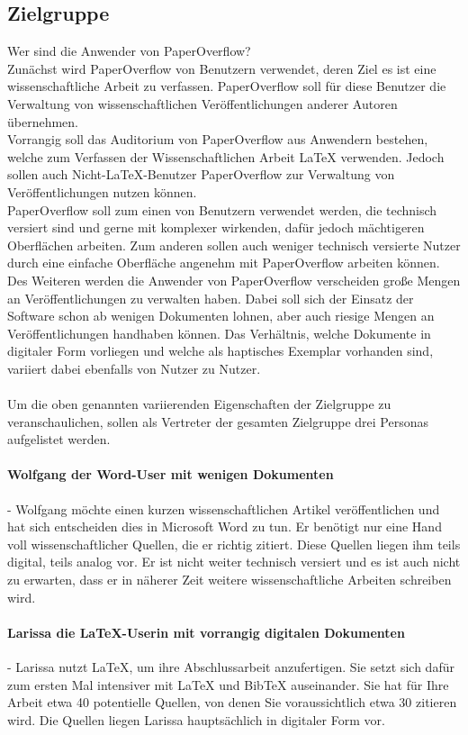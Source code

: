 \documentclass[a4paper,12pt]{article}
\begin{document}
\subsection{Zielgruppe}
Wer sind die Anwender von PaperOverflow?\\
Zunächst wird PaperOverflow von Benutzern verwendet, deren Ziel es ist eine wissenschaftliche Arbeit zu verfassen. PaperOverflow soll für diese Benutzer die Verwaltung von wissenschaftlichen Veröffentlichungen anderer Autoren übernehmen.\\
Vorrangig soll das Auditorium von PaperOverflow aus Anwendern bestehen, welche zum Verfassen der Wissenschaftlichen Arbeit LaTeX verwenden. Jedoch sollen auch Nicht-LaTeX-Benutzer PaperOverflow zur Verwaltung von Veröffentlichungen nutzen können.\\
PaperOverflow soll zum einen von Benutzern verwendet werden, die technisch versiert sind und gerne mit komplexer wirkenden, dafür jedoch mächtigeren Oberflächen arbeiten. Zum anderen sollen auch weniger technisch versierte Nutzer durch eine einfache Oberfläche angenehm mit PaperOverflow arbeiten können.\\
Des Weiteren werden die Anwender von PaperOverflow verscheiden große Mengen an Veröffentlichungen zu verwalten haben. Dabei soll sich der Einsatz der Software schon ab wenigen Dokumenten lohnen, aber auch riesige Mengen an Veröffentlichungen handhaben können. Das Verhältnis, welche Dokumente in digitaler Form vorliegen und welche als haptisches Exemplar vorhanden sind, variiert dabei ebenfalls von Nutzer zu Nutzer.\\
\\
Um die oben genannten variierenden Eigenschaften der Zielgruppe zu veranschaulichen, sollen als Vertreter der gesamten Zielgruppe drei Personas aufgelistet werden.

\paragraph{Wolfgang der Word-User mit wenigen Dokumenten}
- Wolfgang möchte einen kurzen wissenschaftlichen Artikel veröffentlichen und hat sich entscheiden dies in Microsoft Word zu tun. Er benötigt nur eine Hand voll wissenschaftlicher Quellen, die er richtig zitiert. Diese Quellen liegen ihm teils digital, teils analog vor. Er ist nicht weiter technisch versiert und es ist auch nicht zu erwarten, dass er in näherer Zeit weitere wissenschaftliche Arbeiten schreiben wird.

\paragraph{Larissa die LaTeX-Userin mit vorrangig digitalen Dokumenten}
- Larissa nutzt LaTeX, um ihre Abschlussarbeit anzufertigen. Sie setzt sich dafür zum ersten Mal intensiver mit LaTeX und BibTeX auseinander. Sie hat für Ihre Arbeit etwa 40 potentielle Quellen, von denen Sie voraussichtlich etwa 30 zitieren wird. Die Quellen liegen Larissa hauptsächlich in digitaler Form vor.
\end{document}
